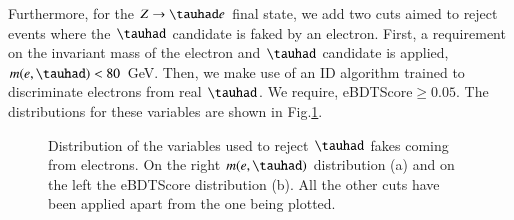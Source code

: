 Furthermore, for the $Z\to\tauhad e$ final state, we add two cuts aimed to reject events where the $\tauhad$ candidate is faked by an electron. First, a requirement on the invariant mass of the electron and $\tauhad$ candidate is applied, $m(e,\tauhad)<80$ GeV. Then, we make use of an ID algorithm trained to discriminate electrons from real $\tauhad$. We require, eBDTScore$\geq 0.05$. The distributions for these variables are shown in Fig.\ref{Fig5}.
\begin{figure}[htbp]
	\centering
	\hfill
	\caption{Distribution of the variables used to reject $\tauhad$ fakes coming from electrons. On the right $m(e,\tauhad)$ distribution (a) and on the left the eBDTScore distribution (b). All the other cuts have been applied apart from the one being plotted.}
	\label{Fig5}
\end{figure}

